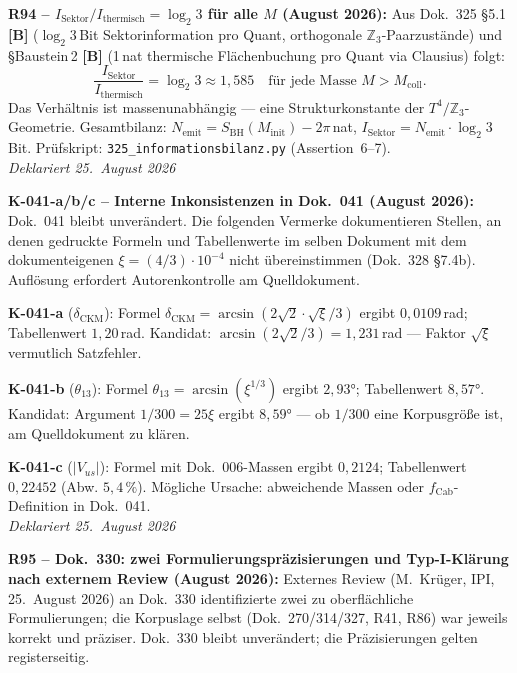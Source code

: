 \textbf{R94 -- $I_\mathrm{Sektor}/I_\mathrm{thermisch} = \log_2 3$ für alle $M$ (August 2026):}
Aus Dok.~325 §5.1 \textbf{[B]} ($\log_2 3$\,Bit Sektorinformation pro Quant,
orthogonale $\mathbb{Z}_3$-Paarzustände) und §Baustein\,2 \textbf{[B]}
(1\,nat thermische Flächenbuchung pro Quant via Clausius) folgt:
\begin{equation*}
  \frac{I_\mathrm{Sektor}}{I_\mathrm{thermisch}} = \log_2 3 \approx 1{,}585
  \quad\text{für jede Masse $M > M_\mathrm{coll}$.}
\end{equation*}
Das Verhältnis ist massenunabhängig --- eine Strukturkonstante der
$T^4/\mathbb{Z}_3$-Geometrie. Gesamtbilanz:
$N_\mathrm{emit} = S_\mathrm{BH}(M_\mathrm{init}) - 2\pi$\,nat,
$I_\mathrm{Sektor} = N_\mathrm{emit}\cdot\log_2 3$\,Bit.
Prüfskript: \texttt{325\_informationsbilanz.py} (Assertion~6--7).\\
\emph{Deklariert 25.~August 2026}

\medskip

\textbf{K-041-a/b/c -- Interne Inkonsistenzen in Dok.~041 (August 2026):}
Dok.~041 bleibt unverändert. Die folgenden Vermerke dokumentieren
Stellen, an denen gedruckte Formeln und Tabellenwerte im selben Dokument
mit dem dokumenteigenen $\xi = (4/3)\cdot10^{-4}$ nicht übereinstimmen
(Dok.~328 §7.4b). Auflösung erfordert Autorenkontrolle am Quelldokument.

\textbf{K-041-a} ($\delta_\mathrm{CKM}$):
Formel $\delta_\mathrm{CKM} = \arcsin(2\sqrt{2}\cdot\sqrt{\xi}/3)$
ergibt $0{,}0109$\,rad; Tabellenwert $1{,}20$\,rad.
Kandidat: $\arcsin(2\sqrt{2}/3) = 1{,}231$\,rad --- Faktor $\sqrt{\xi}$ vermutlich Satzfehler.

\textbf{K-041-b} ($\theta_{13}$):
Formel $\theta_{13} = \arcsin(\xi^{1/3})$ ergibt $2{,}93°$; Tabellenwert $8{,}57°$.
Kandidat: Argument $1/300 = 25\xi$ ergibt $8{,}59°$ ---
ob $1/300$ eine Korpusgröße ist, am Quelldokument zu klären.

\textbf{K-041-c} ($|V_{us}|$):
Formel mit Dok.~006-Massen ergibt $0{,}2124$; Tabellenwert $0{,}22452$ (Abw. $5{,}4\,\%$).
Mögliche Ursache: abweichende Massen oder $f_\mathrm{Cab}$-Definition in Dok.~041.\\
\emph{Deklariert 25.~August 2026}

\medskip

\textbf{R95 -- Dok.~330: zwei Formulierungspräzisierungen und Typ-I-Klärung nach externem Review (August 2026):}
Externes Review (M.~Krüger, IPI, 25.~August 2026) an Dok.~330 identifizierte
zwei zu oberflächliche Formulierungen; die Korpuslage selbst
(Dok.~270/314/327, R41, R86) war jeweils korrekt und präziser.
Dok.~330 bleibt unverändert; die Präzisierungen gelten registerseitig.

